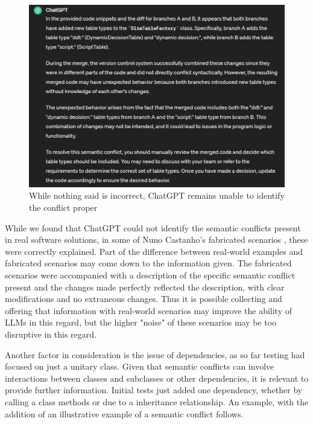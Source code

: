 \begin{figure}
    \centering
    \includegraphics[width=1\linewidth]{figures/almostsemantic.jpg}
    \caption{While nothing said is incorrect, ChatGPT remains unable to identify the conflict proper}
    \label{fig:cantfind}
\end{figure}

While we found that ChatGPT could not identify the semantic conflicts present in real software solutions, in some of Nuno Castanho's fabricated scenarios \cite{kn:nuno}, these were correctly explained. Part of the difference between real-world examples and fabricated scenarios may come down to the information given. The fabricated scenarios were accompanied with a description of the specific semantic conflict present and the changes made perfectly reflected the description, with clear modifications and no extraneous changes. Thus it is possible collecting and offering that information with real-world scenarios may improve the ability of LLMs in this regard, but the higher "noise" of these scenarios may be too disruptive in this regard.

Another factor in consideration is the issue of dependencies, as so far testing had focused on just a unitary class. Given that semantic conflicts can involve interactions between classes and subclasses or other dependencies, it is relevant to provide further information. Initial tests just added one dependency, whether by calling a class methods or due to a inheritance relationship. An example, with the addition of an illustrative example of a semantic conflict follows.

